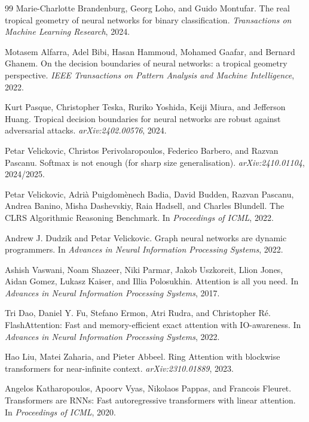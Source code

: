 \documentclass[11pt]{article}
\begin{document}
\begin{thebibliography}{99}
Marie-Charlotte Brandenburg, Georg Loho, and Guido Montufar.
\newblock The real tropical geometry of neural networks for binary classification.
\newblock \emph{Transactions on Machine Learning Research}, 2024.

Motasem Alfarra, Adel Bibi, Hasan Hammoud, Mohamed Gaafar, and Bernard Ghanem.
\newblock On the decision boundaries of neural networks: a tropical geometry perspective.
\newblock \emph{IEEE Transactions on Pattern Analysis and Machine Intelligence}, 2022.

Kurt Pasque, Christopher Teska, Ruriko Yoshida, Keiji Miura, and Jefferson Huang.
\newblock Tropical decision boundaries for neural networks are robust against adversarial attacks.
\newblock \emph{arXiv:2402.00576}, 2024.

Petar Velickovic, Christos Perivolaropoulos, Federico Barbero, and Razvan Pascanu.
\newblock Softmax is not enough (for sharp size generalisation).
\newblock \emph{arXiv:2410.01104}, 2024/2025.

Petar Velickovic, Adri\`a Puigdom\`enech Badia, David Budden, Razvan Pascanu, Andrea Banino, Misha Dashevskiy, Raia Hadsell, and Charles Blundell.
\newblock The CLRS Algorithmic Reasoning Benchmark.
\newblock In \emph{Proceedings of ICML}, 2022.

Andrew J. Dudzik and Petar Velickovic.
\newblock Graph neural networks are dynamic programmers.
\newblock In \emph{Advances in Neural Information Processing Systems}, 2022.

Ashish Vaswani, Noam Shazeer, Niki Parmar, Jakob Uszkoreit, Llion Jones, Aidan Gomez, Lukasz Kaiser, and Illia Polosukhin.
\newblock Attention is all you need.
\newblock In \emph{Advances in Neural Information Processing Systems}, 2017.

Tri Dao, Daniel Y. Fu, Stefano Ermon, Atri Rudra, and Christopher R\'e.
\newblock FlashAttention: Fast and memory-efficient exact attention with IO-awareness.
\newblock In \emph{Advances in Neural Information Processing Systems}, 2022.

Hao Liu, Matei Zaharia, and Pieter Abbeel.
\newblock Ring Attention with blockwise transformers for near-infinite context.
\newblock \emph{arXiv:2310.01889}, 2023.

Angelos Katharopoulos, Apoorv Vyas, Nikolaos Pappas, and Francois Fleuret.
\newblock Transformers are RNNs: Fast autoregressive transformers with linear attention.
\newblock In \emph{Proceedings of ICML}, 2020.


\end{thebibliography}
\end{document}
